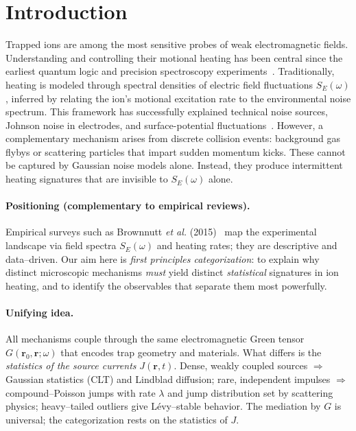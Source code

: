 \section{Introduction}
Trapped ions are among the most sensitive probes of weak electromagnetic fields.
Understanding and controlling their motional heating has been central since the earliest quantum logic and precision spectroscopy experiments~\cite{Turchette2000,Wineland1998}.
Traditionally, heating is modeled through spectral densities of electric field fluctuations $S_E(\omega)$, inferred by relating the ion's motional excitation rate to the environmental noise spectrum.
This framework has successfully explained technical noise sources, Johnson noise in electrodes, and surface-potential fluctuations~\cite{Brownnutt2015}.
However, a complementary mechanism arises from discrete collision events: background gas flybys or scattering particles that impart sudden momentum kicks.
These cannot be captured by Gaussian noise models alone.
Instead, they produce intermittent heating signatures that are invisible to $S_E(\omega)$ alone.

\paragraph{Positioning (complementary to empirical reviews).}
Empirical surveys such as Brownnutt \emph{et al.} (2015)~\cite{Brownnutt2015} map the experimental
landscape via field spectra $S_E(\omega)$ and heating rates; they are descriptive
and data--driven. Our aim here is \emph{first principles categorization}:
to explain why distinct microscopic mechanisms \emph{must} yield distinct
\emph{statistical} signatures in ion heating, and to identify the observables
that separate them most powerfully.

\paragraph{Unifying idea.}
All mechanisms couple through the same electromagnetic Green tensor
$G(\mathbf r_0,\mathbf r;\omega)$ that encodes trap geometry and materials.
What differs is the \emph{statistics of the source currents} $J(\mathbf r,t)$.
Dense, weakly coupled sources $\Rightarrow$ Gaussian statistics (CLT) and
Lindblad diffusion; rare, independent impulses $\Rightarrow$ compound--Poisson
jumps with rate $\lambda$ and jump distribution set by scattering physics;
heavy--tailed outliers give L\'evy--stable behavior. The mediation by $G$ is
universal; the categorization rests on the statistics of $J$.

